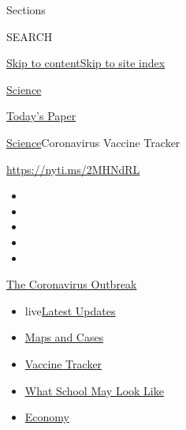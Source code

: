 Sections

SEARCH

\protect\hyperlink{site-content}{Skip to
content}\protect\hyperlink{site-index}{Skip to site index}

\href{https://www.nytimes.com/section/science}{Science}

\href{https://myaccount.nytimes.com/auth/login?response_type=cookie\&client_id=vi}{}

\href{https://www.nytimes.com/section/todayspaper}{Today's Paper}

\href{/section/science}{Science}\textbar{}Coronavirus Vaccine Tracker

\url{https://nyti.ms/2MHNdRL}

\begin{itemize}
\item
\item
\item
\item
\item
\end{itemize}

\href{https://www.nytimes.com/news-event/coronavirus?action=click\&pgtype=Article\&state=default\&region=TOP_BANNER\&context=storylines_menu}{The
Coronavirus Outbreak}

\begin{itemize}
\tightlist
\item
  live\href{https://www.nytimes.com/2020/08/02/world/coronavirus-updates.html?action=click\&pgtype=Article\&state=default\&region=TOP_BANNER\&context=storylines_menu}{Latest
  Updates}
\item
  \href{https://www.nytimes.com/interactive/2020/us/coronavirus-us-cases.html?action=click\&pgtype=Article\&state=default\&region=TOP_BANNER\&context=storylines_menu}{Maps
  and Cases}
\item
  \href{https://www.nytimes.com/interactive/2020/science/coronavirus-vaccine-tracker.html?action=click\&pgtype=Article\&state=default\&region=TOP_BANNER\&context=storylines_menu}{Vaccine
  Tracker}
\item
  \href{https://www.nytimes.com/interactive/2020/07/29/us/schools-reopening-coronavirus.html?action=click\&pgtype=Article\&state=default\&region=TOP_BANNER\&context=storylines_menu}{What
  School May Look Like}
\item
  \href{https://www.nytimes.com/live/2020/07/31/business/stock-market-today-coronavirus?action=click\&pgtype=Article\&state=default\&region=TOP_BANNER\&context=storylines_menu}{Economy}
\end{itemize}

